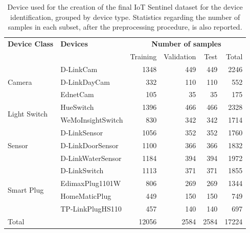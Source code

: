 \begin{table}[t]
\centering
\begin{tabular}{llrrrr}
\toprule
\textbf{Device Class} & \textbf{Devices} & \multicolumn{4}{c}{\textbf{Number of samples}} \\
& & Training & Validation & Test & Total \\
\midrule
\multirow{3}{*}{Camera}  & D-LinkCam     & 1348 & 449 & 449 & 2246  \\
                         & D-LinkDayCam  & 332 & 110 & 110 & 552  \\
                         & EdnetCam      & 105 & 35 & 35 & 175  \\
\midrule
\multirow{2}{*}{Light Switch} & HueSwitch & 1396 & 466 & 466 & 2328 \\
                             &  WeMoInsightSwitch & 830 & 342 & 342 & 1714  \\
\midrule
\multirow{3}{*}{Sensor} &  D-LinkSensor  & 1056 & 352 & 352 & 1760 \\
                         & D-LinkDoorSensor  & 1100 & 366 & 366 & 1832  \\
                         & D-LinkWaterSensor  & 1184 & 394 & 394 & 1972  \\
\midrule
\multirow{4}{*}{Smart Plug}& D-LinkSwitch  & 1113 & 371 & 371 & 1855 \\
                          & EdimaxPlug1101W & 806 & 269 & 269 & 1344  \\
                          & HomeMaticPlug & 449 & 150 & 150 & 749  \\
                          & TP-LinkPlugHS110 & 457 & 140 & 140 & 697  \\
\midrule
\midrule
Total & & 12056 & 2584 & 2584 & 17224 \\
\bottomrule
\end{tabular}
\caption{Device used for the creation of the final IoT Sentinel dataset for the device identification, grouped by device type. Statistics regarding the number of samples in each subset, after the preprocessing procedure, is also reported.}\label{tab:iotdev}
\vspace{12cm}
\end{table}


